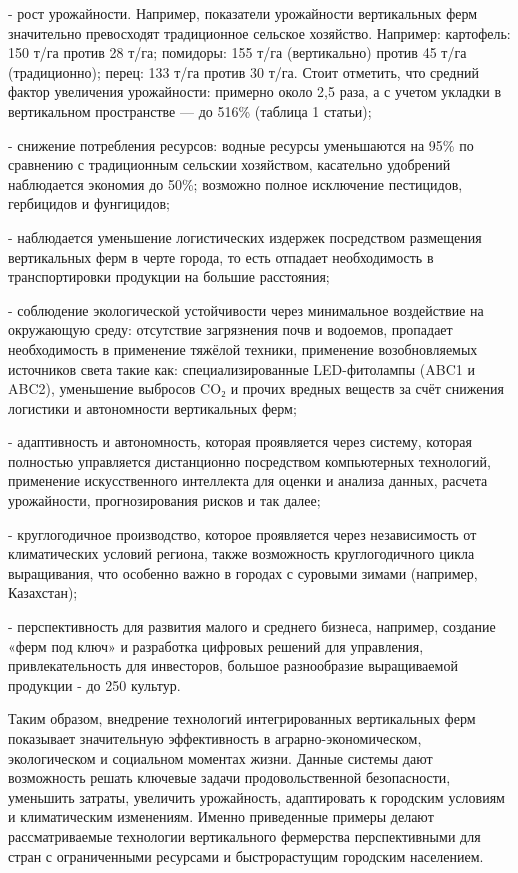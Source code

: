 \begin{multicols}{2}
- рост урожайности. Например, показатели урожайности вертикальных ферм
значительно превосходят традиционное сельское хозяйство. Например:
картофель: 150 т/га против 28 т/га; помидоры: 155 т/га (вертикально)
против 45 т/га (традиционно); перец: 133 т/га против 30 т/га. Стоит
отметить, что средний фактор увеличения урожайности: примерно около 2,5
раза, а с учетом укладки в вертикальном пространстве --- до 516\%
(таблица 1 статьи);

- снижение потребления ресурсов: водные ресурсы уменьшаются на 95\% по
сравнению с традиционным сельскии хозяйством, касательно удобрений
наблюдается экономия до 50\%; возможно полное исключение пестицидов,
гербицидов и фунгицидов;

- наблюдается уменьшение логистических издержек посредством размещения
вертикальных ферм в черте города, то есть отпадает необходимость в
транспортировки продукции на большие расстояния;

- соблюдение экологической устойчивости через минимальное воздействие на
окружающую среду: отсутствие загрязнения почв и водоемов, пропадает
необходимость в применение тяжёлой техники, применение возобновляемых
источников света такие как: специализированные LED-фитолампы (ABC1 и
ABC2), уменьшение выбросов CO₂ и прочих вредных веществ за счёт снижения
логистики и автономности вертикальных ферм;

- адаптивность и автономность, которая проявляется через систему,
которая полностью управляется дистанционно посредством компьютерных
технологий, применение искусственного интеллекта для оценки и анализа
данных, расчета урожайности, прогнозирования рисков и так далее;

- круглогодичное производство, которое проявляется через независимость
от климатических условий региона, также возможность круглогодичного
цикла выращивания, что особенно важно в городах с суровыми зимами
(например, Казахстан);

- перспективность для развития малого и среднего бизнеса, например,
создание «ферм под ключ» и разработка цифровых решений для управления,
привлекательность для инвесторов, большое разнообразие выращиваемой
продукции - до 250 культур.

Таким образом, внедрение технологий интегрированных вертикальных ферм
показывает значительную эффективность в аграрно-экономическом,
экологическом и социальном моментах жизни. Данные системы дают
возможность решать ключевые задачи продовольственной безопасности,
уменьшить затраты, увеличить урожайность, адаптировать к городским
условиям и климатическим изменениям. Именно приведенные примеры делают
рассматриваемые технологии вертикального фермерства перспективными для
стран с ограниченными ресурсами и быстрорастущим городским населением.


\end{multicols}
